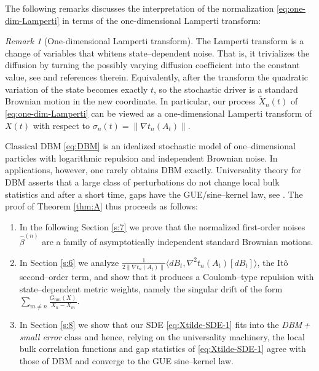 \documentclass[12pt,reqno]{amsart}
\theoremstyle{plain}
\theoremstyle{definition}
\theoremstyle{remark}
\newtheorem{rem}{Remark}[section]       %
\begin{document}
The following remarks discusses the interpretation of the normalization \eqref{eq:one-dim-Lamperti} in terms of the one-dimensional Lamperti transform:

\begin{rem}[One-dimensional Lamperti transform]
The Lamperti transform is a change of variables that whitens state–dependent noise. That is, it
trivializes the diffusion by turning the possibly varying diffusion coefficient into the constant
value, see \cite{DeBoerLamperti,
MoellerMadsen2010Lamperti} and references therein. Equivalently, after the transform the quadratic variation of the state becomes exactly \(t\),
so the stochastic driver is a standard Brownian motion in the new coordinate. In particular, our process $\widetilde{X}_n(t)$ of \eqref{eq:one-dim-Lamperti} can be viewed as a one-dimensional Lamperti transform of $X(t)$ with respect to $\sigma_n(t)=\big\|\nabla t_n(A_t) \big\|$.
\end{rem}

Classical DBM \eqref{eq:DBM} is an idealized stochastic model of one–dimensional
particles with logarithmic repulsion and independent Brownian noise. In applications, however,
one rarely obtains DBM exactly. Universality theory for DBM asserts that
a large class of perturbations do not change local bulk statistics and after a short time, gaps have the GUE/sine–kernel law, see \cite{ErdosSchleinYau2011,ErdosYau2012,
BourgadeErdosYau2014,LandonSosoeYau2017,
DeiftBook,ForresterBook}.  
The proof of Theorem \ref{thm:A} thus proceeds as follows: 
\begin{enumerate}
\item In the following Section \ref{s:7} we prove that the normalized first-order noises $\hat{\beta}^{(n)}$ are a family of asymptotically independent standard Brownian motions. 

\item In Section \ref{s:6} we analyze $\frac{1}{2\big\|\nabla t_n(A_t) \big\|} \langle dB_t, \nabla^2 t_n(A_t)[dB_t] \rangle$, the Itô second–order term, and show that it produces a Coulomb–type repulsion with state–dependent metric weights, namely the singular drift of the form \(\sum_{m\ne n} \frac{G_{nm}(X)}{X_n-X_m}\).

\item In Section \ref{s:8} we show that our SDE \eqref{eq:Xtilde-SDE-1} fits into the \emph{DBM\,+\,small error} class and hence, relying on the universality machinery, the local bulk correlation functions and gap statistics of \eqref{eq:Xtilde-SDE-1} agree with those of DBM and converge to the GUE sine–kernel law.
\end{enumerate}
\end{document}
